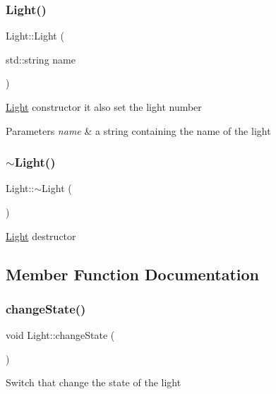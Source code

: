 \subsubsection{\texorpdfstring{Light()}{Light()}\hspace{0.1cm}{\footnotesize\ttfamily [2/2]}}
{\footnotesize\ttfamily Light\+::\+Light (\begin{DoxyParamCaption}\item[{std\+::string}]{name }\end{DoxyParamCaption})}

\hyperlink{classLight}{Light} constructor it also set the light number 
\begin{DoxyParams}{Parameters}
{\em name} & a string containing the name of the light \\
\hline
\end{DoxyParams}
\mbox{\label{classLight_ad0e59fad13bb6cfadc25b2c477e9ddc7}} 
\subsubsection{\texorpdfstring{$\sim$\+Light()}{~Light()}}
{\footnotesize\ttfamily Light\+::$\sim$\+Light (\begin{DoxyParamCaption}{ }\end{DoxyParamCaption})\hspace{0.3cm}{\ttfamily [virtual]}}

\hyperlink{classLight}{Light} destructor 

\subsection{Member Function Documentation}
\mbox{\label{classLight_a5d257d1ad65b8c8ab986dcbba2e9c5ff}} 
\subsubsection{\texorpdfstring{change\+State()}{changeState()}}
{\footnotesize\ttfamily void Light\+::change\+State (\begin{DoxyParamCaption}{ }\end{DoxyParamCaption})}

Switch that change the state of the light \mbox{\label{classLight_a3990013078306656215c200537868835}} 
